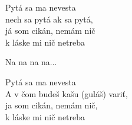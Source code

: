 
\ve{}
Pytá sa ma nevesta\\
nech sa pytá ak sa pytá,\\
já som cikán, nemám nič\\
k láske mi nič netreba

\cho{}
Na na na na...

\ve{}
Pytá sa ma nevesta\\
A v čom budeš kašu (guláš) variť,\\
ja som cikán, nemám nič,\\
k láske mi nič netreba

\cho{}


\esong {}